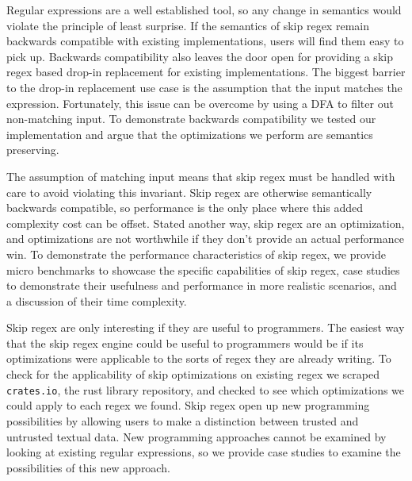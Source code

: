 Regular expressions are a well established tool, so any change in
semantics would violate the principle of least surprise.
If the semantics of skip regex remain backwards compatible with
existing implementations, users will find them easy to pick up.
Backwards compatibility also leaves the door open for providing
a skip regex based drop-in replacement for existing implementations.
The biggest barrier to the drop-in replacement use case is the
assumption that the input matches the expression. Fortunately,
this issue can be overcome by using a DFA to filter out non-matching
input. To demonstrate backwards compatibility we tested our implementation
and argue that the optimizations we perform are semantics preserving.

The assumption of matching input means that skip regex must be 
handled with care to avoid violating this invariant.
Skip regex are otherwise semantically backwards compatible, so
performance is the only place where this added complexity cost can be
offset. Stated another way, skip regex are an optimization,
and optimizations are not worthwhile if they don't provide an
actual performance win. To demonstrate the performance characteristics
of skip regex, we provide micro benchmarks to showcase the specific
capabilities of skip regex, case studies to demonstrate their
usefulness and performance in more realistic scenarios, and a
discussion of their time complexity.

Skip regex are only interesting if they are useful to programmers.
The easiest way that the skip regex engine could be useful to programmers
would be if its optimizations were applicable to the sorts of regex they
are already writing. To check for the applicability of skip optimizations
on existing regex we scraped \verb'crates.io',
the rust library repository, and checked to see which optimizations
we could apply to each regex we found. Skip regex open up new programming
possibilities by allowing users to make a distinction between trusted
and untrusted textual data. New programming approaches cannot be 
examined by looking at existing regular expressions, so we provide
case studies to examine the possibilities of this new approach.


